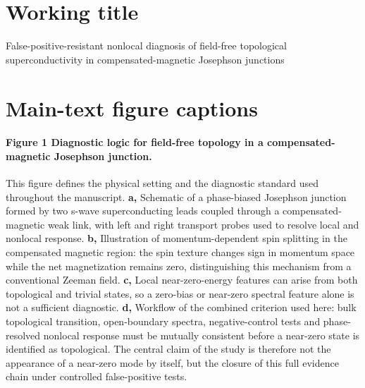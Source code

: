 
\section*{Working title}

False-positive-resistant nonlocal diagnosis of field-free topological superconductivity in compensated-magnetic Josephson junctions

\section*{Main-text figure captions}

\paragraph{Figure 1 \textbar{} Diagnostic logic for field-free topology in a compensated-magnetic Josephson junction.}
This figure defines the physical setting and the diagnostic standard used throughout the manuscript. \textbf{a,} Schematic of a phase-biased Josephson junction formed by two s-wave superconducting leads coupled through a compensated-magnetic weak link, with left and right transport probes used to resolve local and nonlocal response. \textbf{b,} Illustration of momentum-dependent spin splitting in the compensated magnetic region: the spin texture changes sign in momentum space while the net magnetization remains zero, distinguishing this mechanism from a conventional Zeeman field. \textbf{c,} Local near-zero-energy features can arise from both topological and trivial states, so a zero-bias or near-zero spectral feature alone is not a sufficient diagnostic. \textbf{d,} Workflow of the combined criterion used here: bulk topological transition, open-boundary spectra, negative-control tests and phase-resolved nonlocal response must be mutually consistent before a near-zero state is identified as topological. The central claim of the study is therefore not the appearance of a near-zero mode by itself, but the closure of this full evidence chain under controlled false-positive tests.

